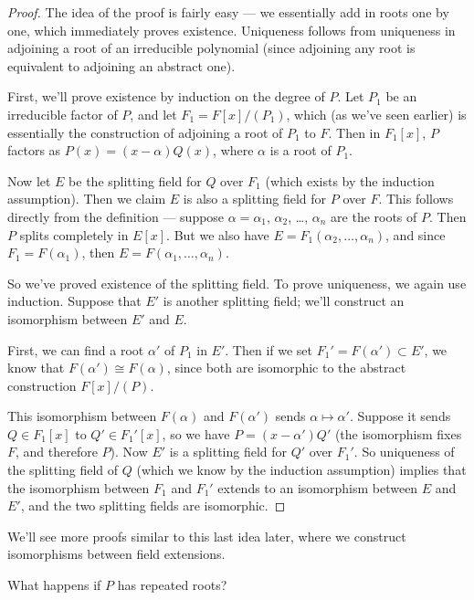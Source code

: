 \begin{proof}
    The idea of the proof is fairly easy --- we essentially add in roots one by one, which immediately proves existence. Uniqueness follows from uniqueness in adjoining a root of an irreducible polynomial (since adjoining any root is equivalent to adjoining an abstract one). 

    First, we'll prove existence by induction on the degree of $P$. Let $P_1$ be an irreducible factor of $P$, and let $F_1 = F[x]/(P_1)$, which (as we've seen earlier) is essentially the construction of adjoining a root of $P_1$ to $F$. Then in $F_1[x]$, $P$ factors as $P(x) = (x - \alpha)Q(x)$, where $\alpha$ is a root of $P_1$.
    
    Now let $E$ be the splitting field for $Q$ over $F_1$ (which exists by the induction assumption). Then we claim $E$ is also a splitting field for $P$ over $F$. This follows directly from the definition --- suppose $\alpha = \alpha_1$, $\alpha_2$, \ldots, $\alpha_n$ are the roots of $P$. Then $P$ splits completely in $E[x]$. But we also have $E = F_1(\alpha_2, \ldots, \alpha_n)$, and since $F_1 = F(\alpha_1)$, then $E = F(\alpha_1, \ldots, \alpha_n)$. 

    So we've proved existence of the splitting field. To prove uniqueness, we again use induction. Suppose that $E'$ is another splitting field; we'll construct an isomorphism between $E'$ and $E$. 

    First, we can find a root $\alpha'$ of $P_1$ in $E'$. Then if we set $F_1' = F(\alpha') \subset E'$, we know that $F(\alpha') \cong F(\alpha)$, since both are isomorphic to the abstract construction $F[x]/(P)$. 
    
    This isomorphism between $F(\alpha)$ and $F(\alpha')$ sends $\alpha \mapsto \alpha'$. Suppose it sends $Q \in F_1[x]$ to $Q' \in F_1'[x]$, so we have $P = (x - \alpha')Q'$ (the isomorphism fixes $F$, and therefore $P$). Now $E'$ is a splitting field for $Q'$ over $F_1'$. So uniqueness of the splitting field of $Q$ (which we know by the induction assumption) implies that the isomorphism between $F_1$ and $F_1'$ extends to an isomorphism between $E$ and $E'$, and the two splitting fields are isomorphic. 
\end{proof}

We'll see more proofs similar to this last idea later, where we construct isomorphisms between field extensions. 

\begin{question}
What happens if $P$ has repeated roots? 
\end{question}

